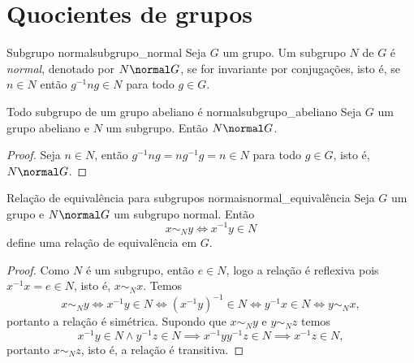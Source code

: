 \section{Quocientes de grupos}
\begin{definition}{Subgrupo normal}{subgrupo_normal}
    Seja \(G\) um grupo. Um subgrupo \(N\) de \(G\) é \emph{normal}, denotado por \(N \normal G\), se for invariante por conjugações, isto é, se \(n \in N\) então \(g^{-1} n g \in N\) para todo \(g \in G\).
\end{definition}

\begin{proposition}{Todo subgrupo de um grupo abeliano é normal}{subgrupo_abeliano}
    Seja \(G\) um grupo abeliano e \(N\) um subgrupo. Então \(N \normal G\).
\end{proposition}
\begin{proof}
    Seja \(n \in N\), então \(g^{-1}ng = ng^{-1}g = n \in N\) para todo \(g \in G\), isto é, \(N \normal G\).
\end{proof}

\begin{proposition}{Relação de equivalência para subgrupos normais}{normal_equivalência}
    Seja \(G\) um grupo e \(N \normal G\) um subgrupo normal. Então
    \begin{equation*}
        x \sim_N y \iff x^{-1}y \in N
    \end{equation*}
    define uma relação de equivalência em \(G\).
\end{proposition}
\begin{proof}
    Como \(N\) é um subgrupo, então \(e \in N\), logo a relação é reflexiva pois \(x^{-1}x = e \in N\), isto é, \(x \sim_N x\). Temos
    \begin{equation*}
        x \sim_N y \iff x^{-1} y \in N \iff (x^{-1}y)^{-1} \in N \iff y^{-1}x \in N \iff y \sim_N x,
    \end{equation*}
    portanto a relação é simétrica. Supondo que \(x \sim_N y\) e \(y \sim_N z\) temos
    \begin{equation*}
        x^{-1}y \in N \land y^{-1}z \in N \implies x^{-1}y y^{-1} z \in N \implies x^{-1} z \in N,
    \end{equation*}
    portanto \(x \sim_N z\), isto é, a relação é transitiva.
\end{proof}

